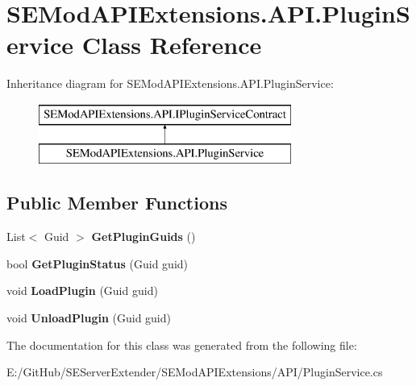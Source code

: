 \hypertarget{class_s_e_mod_a_p_i_extensions_1_1_a_p_i_1_1_plugin_service}{}\section{S\+E\+Mod\+A\+P\+I\+Extensions.\+A\+P\+I.\+Plugin\+Service Class Reference}
\label{class_s_e_mod_a_p_i_extensions_1_1_a_p_i_1_1_plugin_service}
Inheritance diagram for S\+E\+Mod\+A\+P\+I\+Extensions.\+A\+P\+I.\+Plugin\+Service\+:\begin{figure}[H]
\begin{center}
\leavevmode
\includegraphics[height=2.000000cm]{class_s_e_mod_a_p_i_extensions_1_1_a_p_i_1_1_plugin_service}
\end{center}
\end{figure}
\subsection*{Public Member Functions}
\begin{DoxyCompactItemize}
\item 
\hypertarget{class_s_e_mod_a_p_i_extensions_1_1_a_p_i_1_1_plugin_service_a312342cd9ad91733bcb1f2fb5192feb5}{}List$<$ Guid $>$ {\bfseries Get\+Plugin\+Guids} ()\label{class_s_e_mod_a_p_i_extensions_1_1_a_p_i_1_1_plugin_service_a312342cd9ad91733bcb1f2fb5192feb5}

\item 
\hypertarget{class_s_e_mod_a_p_i_extensions_1_1_a_p_i_1_1_plugin_service_a06f10473fd69a3edd78b59ca5cef0e7c}{}bool {\bfseries Get\+Plugin\+Status} (Guid guid)\label{class_s_e_mod_a_p_i_extensions_1_1_a_p_i_1_1_plugin_service_a06f10473fd69a3edd78b59ca5cef0e7c}

\item 
\hypertarget{class_s_e_mod_a_p_i_extensions_1_1_a_p_i_1_1_plugin_service_a14deda9eeb5bd5bc2de2fef02fa070b0}{}void {\bfseries Load\+Plugin} (Guid guid)\label{class_s_e_mod_a_p_i_extensions_1_1_a_p_i_1_1_plugin_service_a14deda9eeb5bd5bc2de2fef02fa070b0}

\item 
\hypertarget{class_s_e_mod_a_p_i_extensions_1_1_a_p_i_1_1_plugin_service_ad348111904ae3bda43c77168578ac361}{}void {\bfseries Unload\+Plugin} (Guid guid)\label{class_s_e_mod_a_p_i_extensions_1_1_a_p_i_1_1_plugin_service_ad348111904ae3bda43c77168578ac361}

\end{DoxyCompactItemize}


The documentation for this class was generated from the following file\+:\begin{DoxyCompactItemize}
\item 
E\+:/\+Git\+Hub/\+S\+E\+Server\+Extender/\+S\+E\+Mod\+A\+P\+I\+Extensions/\+A\+P\+I/Plugin\+Service.\+cs\end{DoxyCompactItemize}

